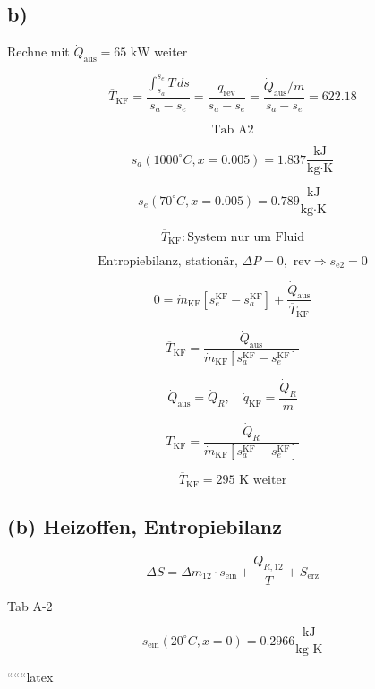 

\subsection*{b)}
Rechne mit \(\dot{Q}_{\text{aus}} = 65 \text{ kW} \) weiter

\[
\overline{T}_{\text{KF}} = \frac{\int_{s_a}^{s_e} T \, ds}{s_a - s_e} = \frac{q_{\text{rev}}}{s_a - s_e} = \frac{\dot{Q}_{\text{aus}} / \dot{m}}{s_a - s_e} = 622.18
\]

\[
\text{Tab A2}
\]

\[
s_a (1000^\circ C, x = 0.005) = 1.837 \frac{\text{kJ}}{\text{kg} \cdot \text{K}}
\]

\[
s_e (70^\circ C, x = 0.005) = 0.789 \frac{\text{kJ}}{\text{kg} \cdot \text{K}}
\]

\[
\overline{T}_{\text{KF}} : \text{System nur um Fluid}
\]

\[
\text{Entropiebilanz, stationär, } \Delta P = 0, \text{ rev} \Rightarrow s_{\text{e2}} = 0
\]

\[
0 = \dot{m}_{\text{KF}} \left[ s_e^{\text{KF}} - s_a^{\text{KF}} \right] + \frac{\dot{Q}_{\text{aus}}}{\overline{T}_{\text{KF}}}
\]

\[
\overline{T}_{\text{KF}} = \frac{\dot{Q}_{\text{aus}}}{\dot{m}_{\text{KF}} \left[ s_a^{\text{KF}} - s_e^{\text{KF}} \right]}
\]

\[
\dot{Q}_{\text{aus}} = \dot{Q}_R, \quad \dot{q}_{\text{KF}} = \frac{\dot{Q}_R}{\dot{m}}
\]

\[
\overline{T}_{\text{KF}} = \frac{\dot{Q}_R}{\dot{m}_{\text{KF}} \left[ s_a^{\text{KF}} - s_e^{\text{KF}} \right]}
\]

\[
\overline{T}_{\text{KF}} = 295 \text{ K} \text{ weiter}
\]

\subsection*{(b) Heizoffen, Entropiebilanz}

\[
\Delta S = \Delta m_{12} \cdot s_{\text{ein}} + \frac{Q_{R,12}}{T} + S_{\text{erz}}
\]

Tab A-2

\[
s_{\text{ein}} (20^\circ C, x=0) = 0.2966 \frac{\text{kJ}}{\text{kg K}}
\]

``````latex